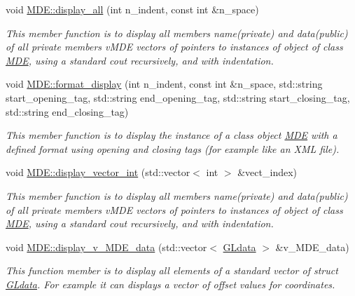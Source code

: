 \begin{DoxyCompactItemize}
void \hyperlink{group__group__display_ga209fa87837f6b30256bbcdf8f33e1752}{M\+D\+E\+::display\+\_\+all} (int n\+\_\+indent, const int \&n\+\_\+space)
\begin{DoxyCompactList}\small\item\em This member function is to display all members \textquotesingle{}name\textquotesingle{}(private) and \textquotesingle{}data\textquotesingle{}(public) of all private members v\+M\+DE vectors of pointers to instances of object of class \hyperlink{classMDE}{M\+DE}, using a standard cout recursively, and with indentation. \end{DoxyCompactList}\item 
void \hyperlink{group__group__display_gaa484ce5bc4e4726e45e06789b0891b6f}{M\+D\+E\+::format\+\_\+display} (int n\+\_\+indent, const int \&n\+\_\+space, std\+::string start\+\_\+opening\+\_\+tag, std\+::string end\+\_\+opening\+\_\+tag, std\+::string start\+\_\+closing\+\_\+tag, std\+::string end\+\_\+closing\+\_\+tag)
\begin{DoxyCompactList}\small\item\em This member function is to display the instance of a class object \hyperlink{classMDE}{M\+DE} with a defined format using opening and closing tags (for example like an X\+ML file). \end{DoxyCompactList}\item 
void \hyperlink{group__group__display_gaeee364777c1584d310bd698c9e9b40f4}{M\+D\+E\+::display\+\_\+vector\+\_\+int} (std\+::vector$<$ int $>$ \&vect\+\_\+index)
\begin{DoxyCompactList}\small\item\em This member function is to display all members \textquotesingle{}name\textquotesingle{}(private) and \textquotesingle{}data\textquotesingle{}(public) of all private members v\+M\+DE vectors of pointers to instances of object of class \hyperlink{classMDE}{M\+DE}, using a standard cout recursively, and with indentation. \end{DoxyCompactList}\item 
void \hyperlink{group__group__display_ga38a0f84bbf5c8652014c84fa7ce92610}{M\+D\+E\+::display\+\_\+v\+\_\+\+M\+D\+E\+\_\+data} (std\+::vector$<$ \hyperlink{structGLdata}{G\+Ldata} $>$ \&v\+\_\+\+M\+D\+E\+\_\+data)
\begin{DoxyCompactList}\small\item\em This function member is to display all elements of a standard vector of struct \hyperlink{structGLdata}{G\+Ldata}. For example it can displays a vector of offset values for coordinates. \end{DoxyCompactList}\end{DoxyCompactItemize}


